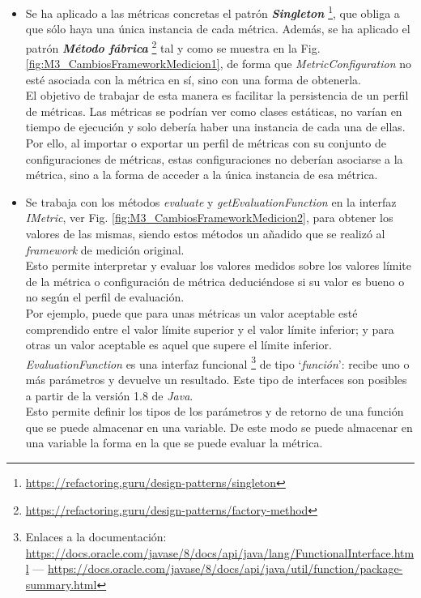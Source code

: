 \begin{itemize}
	\tightlist
	\item Se ha aplicado a las métricas concretas el patrón \textit{\textbf{Singleton}} \footnote{\url{https://refactoring.guru/design-patterns/singleton}}, que obliga a que sólo haya una única instancia de cada métrica. Además, se ha aplicado el patrón \textit{\textbf{Método fábrica}} \footnote{\url{https://refactoring.guru/design-patterns/factory-method}} tal y como se muestra en la Fig. \ref{fig:M3_CambiosFrameworkMedicion1}, de forma que \textit{MetricConfiguration} no esté asociada con la métrica en sí, sino con una forma de obtenerla.\\
	El objetivo de trabajar de esta manera es facilitar la persistencia de un perfil de métricas. Las métricas se podrían ver como clases estáticas, no varían en tiempo de ejecución y solo debería haber una instancia de cada una de ellas. Por ello, al importar o exportar un perfil de métricas con su conjunto de configuraciones de métricas, estas configuraciones no deberían asociarse a la métrica, sino a la forma de acceder a la única instancia de esa métrica. 
	\item Se trabaja con los métodos \textit{evaluate} y \textit{getEvaluationFunction} en la interfaz \textit{IMetric}, ver Fig. \ref{fig:M3_CambiosFrameworkMedicion2}, para obtener los valores de las mismas, siendo estos métodos un añadido que se realizó al \textit{framework} de medición original.\\
	Esto permite interpretar y evaluar los valores medidos sobre los valores límite de la métrica o configuración de métrica deduciéndose si su valor es bueno o no según el perfil de evaluación.\\
	 Por ejemplo, puede que para unas métricas un valor aceptable esté comprendido entre el valor límite superior y el valor límite inferior; y para otras un valor aceptable es aquel que supere el límite inferior.\\
	\textit{EvaluationFunction} es una interfaz funcional \footnote{Enlaces a la documentación: \url{https://docs.oracle.com/javase/8/docs/api/java/lang/FunctionalInterface.html} --- \url{https://docs.oracle.com/javase/8/docs/api/java/util/function/package-summary.html}} 
	de tipo `\textit{función}': recibe uno o más parámetros y devuelve un resultado. Este tipo de interfaces son posibles a partir de la versión 1.8 de \textit{Java}.\\
	Esto permite definir los tipos de los parámetros y de retorno de una función que se puede almacenar en una variable. De este modo se puede almacenar en una variable la forma en la que se puede evaluar la métrica.
\end{itemize}

